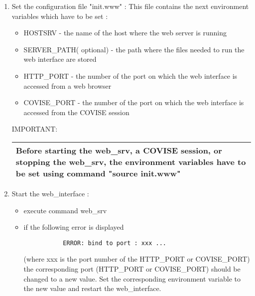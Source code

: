   \begin{enumerate}
  \item Set the configuration file "init.www" : \newline
        This file contains the next environment variables which have to be set :
	\begin{itemize}
         \item HOSTSRV - the name of the host where the web server is running
         \item SERVER\_PATH( optional) - the path where the files needed to run the web interface are stored
         \item HTTP\_PORT - the number of the port on which the web interface is accessed from a web browser
         \item COVISE\_PORT - the number of the port on which the web interface is accessed
	 from the COVISE session
        \end{itemize}
	
	{\LARGE IMPORTANT:}
	
	\begin{longtable}{|p{13cm}|}
        \hline
	        Before starting the web\_srv, a COVISE session, or
        stopping the web\_srv, the environment variables
        have to be set using command "source init.www"\\
	\hline
        \end{longtable}
        

  \item Start the web\_interface :
        \begin{itemize}
         \item execute command web\_srv
         \item if the following error is displayed
        \begin{verbatim}
	       ERROR: bind to port : xxx ... 
	\end{verbatim}
        (where xxx is the port number of the HTTP\_PORT or COVISE\_PORT)
        the corresponding port (HTTP\_PORT or COVISE\_PORT)
        should be changed to a new value. Set the corresponding environment
        variable to the new value and restart the web\_interface.
        \end{itemize}
	

\end{enumerate}
